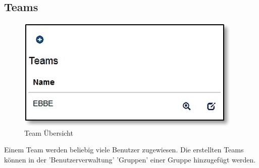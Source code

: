 \pagebreak
\subsection{Teams}

\begin{figure}   %
  \vspace{-55pt}      %
  \begin{center}
    \includegraphics[width=1\linewidth]{../chapters/14_Benutzerverwaltung/pictures/14-2_TeamsUebersicht_m.jpg}
  \end{center}
  \vspace{-20pt}
  \caption{Team Übersicht}
  \vspace{-10pt}
\end{figure}

Einem Team werden beliebig viele Benutzer zugewiesen. Die erstellten Teams können in der 'Benutzerverwaltung' 'Gruppen' einer Gruppe hinzugefügt werden.

\vspace{1.5cm}


